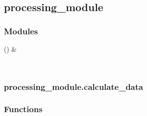 \documentclass[a4paper,11pt,russian,openany,oneside]{sphinxmanual}
\begin{document}
\sphinxstepscope


\subsection{processing\_module}
\label{\detokenize{_autosummary/processing_module:module-processing_module}}\label{\detokenize{_autosummary/processing_module:processing-module}}\label{\detokenize{_autosummary/processing_module::doc}}\subsubsection*{Modules}


\begin{savenotes}\sphinxattablestart
\sphinxthistablewithglobalstyle
\sphinxthistablewithnovlinesstyle
\centering
\begin{tabulary}{\linewidth}[t]{}
\sphinxtoprule
\sphinxtableatstartofbodyhook
\sphinxAtStartPar
{\hyperref[\detokenize{processing_module:module-processing_module.calculate_data}]{}} ()
&
\sphinxAtStartPar

\\
\sphinxbottomrule
\end{tabulary}
\sphinxtableafterendhook\par
\sphinxattableend\end{savenotes}

\sphinxstepscope


\subsubsection{processing\_module.calculate\_data}
\label{\detokenize{_autosummary/processing_module.calculate_data:module-processing_module.calculate_data}}\label{\detokenize{_autosummary/processing_module.calculate_data:processing-module-calculate-data}}\label{\detokenize{_autosummary/processing_module.calculate_data::doc}}\subsubsection*{Functions}
\end{document}

